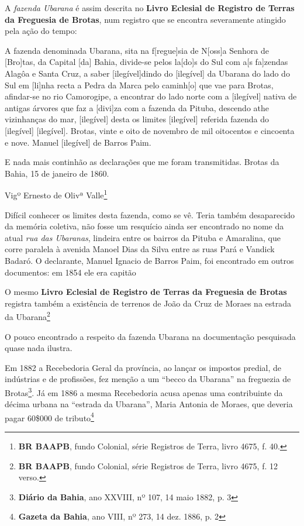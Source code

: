 A \textit{fazenda Ubarana} é assim descrita no \textbf{Livro Eclesial de Registro de Terras da Freguesia de Brotas}, num registro que se encontra severamente atingido pela ação do tempo:

\begin{citacao}
A fazenda denominada Ubarana, sita na f[regue]sia de N[oss]a Senhora de [Bro]tas, da Capital [da] Bahia, divide-se pelos la[do]s do Sul com a[s fa]zendas Alagôa e Santa Cruz, a saber [ilegível]dindo do [ilegível] da Ubarana do lado do Sul em [li]nha recta a Pedra da Marca pelo caminh[o] que vae para Brotas, afindar-se no rio Camorogipe, a encontrar do lado norte com a [ilegível] nativa de antigas árvores que faz a [divi]za com a fazenda da Pituba, descendo athe vizinhanças do mar, [ilegível] desta os limites [ilegível] referida fazenda do [ilegível] [ilegível]. Brotas, vinte e oito de novembro de mil oitocentos e cincoenta e nove. Manuel [ilegível] de Barros Paim.

E nada mais continhão as declarações que me foram transmitidas. Brotas da Bahia, 15 de janeiro de 1860.

Vigº Ernesto de Olivª Valle\footnote{\textbf{BR BAAPB}, fundo Colonial, série Registros de Terra, livro 4675, f. 40.}
\end{citacao}

Difícil conhecer os limites desta fazenda, como se vê. Teria também desaparecido da memória coletiva, não fosse um resquício ainda ser encontrado no nome da atual \textit{rua das Ubaranas}, lindeira entre os bairros da Pituba e Amaralina, que corre paralela à avenida Manoel Dias da Silva entre as ruas Pará e Vandick Badaró. O declarante, Manuel Ignacio de Barros Paim, foi encontrado em outros documentos: em 1854 ele era capitão \cite[p.~172]{masson_almanak_1854}

O mesmo \textbf{Livro Eclesial de Registro de Terras da Freguesia de Brotas} registra também a existência de terrenos de João da Cruz de Moraes na estrada da Ubarana\footnote{\textbf{BR BAAPB}, fundo Colonial, série Registros de Terra, livro 4675, f. 12 verso.}



O pouco encontrado a respeito da fazenda Ubarana na documentação pesquisada quase nada ilustra.

Em 1882 a Recebedoria Geral da província, ao lançar os impostos predial, de indústrias e de profissões, fez menção a um ``becco da Ubarana'' na freguezia de Brotas\footnote{\textbf{Diário da Bahia}, ano XXVIII, nº 107, 14 maio 1882, p. 3}. Já em 1886 a mesma Recebedoria acusa apenas uma contribuinte da décima urbana na ``estrada da Ubarana'', Maria Antonia de Moraes, que deveria pagar 60\$000 de tributo\footnote{\textbf{Gazeta da Bahia}, ano VIII, nº 273, 14 dez. 1886, p. 2}

